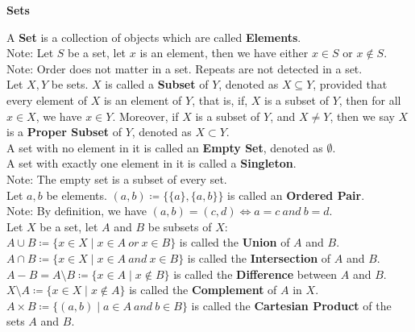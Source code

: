\documentclass[11pt]{article}
\newcommand{\note}{\color{gray}Note: \color{black}}
\begin{document}
	\LARGE \color{red}
		\noindent \textbf{Sets}\\
	\normalsize \color{black}
	
		\noindent A \textbf{Set} is a collection of objects which are called \textbf{Elements}.\\
		\note Let $S$ be a set, let $x$ is an element, then we have either $x \in S$ or $ x \notin S$.\\
		\note Order does not matter in a set. Repeats are not detected in a set.\\
		
		\noindent Let $X,Y$ be sets. $X$ is called a \textbf{Subset} of $Y$, denoted as $X \subseteq Y$, provided that every element of $X$ is an element of $Y$, that is, if, $X$ is a subset of $Y$, then for all $x \in X$, we have $x \in Y$. Moreover, if $X$ is a subset of $Y$, and $X \neq Y$, then we say $X$ is a \textbf{Proper Subset} of $Y$, denoted as $X \subset Y$.\\
	
		\noindent A set with no element in it is called an \textbf{Empty Set}, denoted as $\emptyset$.\\
		A set with exactly one element in it is called a \textbf{Singleton}.\\
		\note The empty set is a subset of every set.\\
	
		\noindent Let $a,b$ be elements. $(a,b) \coloneqq \{\{a\},\{a,b\}\}$ is called an \textbf{Ordered Pair}.\\
		\note By definition, we have $(a,b)=(c,d) \iff a=c \ and \ b=d$.\\
		
	
		\noindent Let $X$ be a set, let $A$ and $B$ be subsets of $X$:\\
		$A \cup B \coloneqq \{x \in X \mid x \in A \ or \ x \in B \}$  is called the \textbf{Union} of $A$ and $B$.\\
		$A \cap B \coloneqq \{x \in X \mid x \in A \ and \ x \in B \}$  is called the \textbf{Intersection} of $A$ and $B$.\\
		$A-B = A \setminus B \coloneqq \{x \in A \mid x \notin B \}$  is called the \textbf{Difference} between $A$ and $B$.\\	
		$X \setminus A \coloneqq \{x \in X \mid x \notin A \}$  is called the \textbf{Complement} of $A$ in $X$.\\
		$A \times B \coloneqq \{ (a,b) \mid a \in A \ and \ b \in B\}$ is called the \textbf{Cartesian Product} of the sets $A$ and $B$.\\
	
\end{document}
